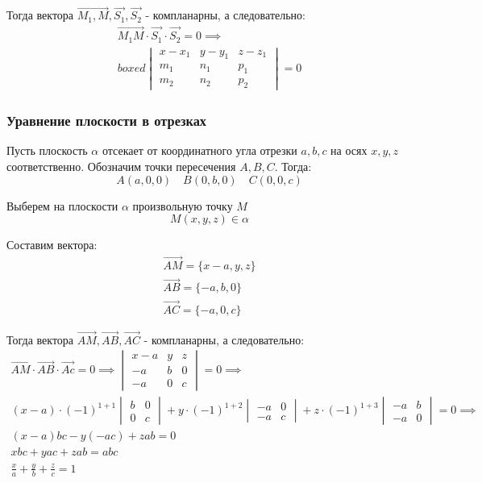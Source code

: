 Тогда вектора $\overrightarrow{M_1, M}, \vec{S_1}, \vec{S_2}$ - компланарны, а следовательно:
\begin{gather*}
  \overrightarrow{M_1 M} \cdot \vec{S_1} \cdot \vec{S_2} = 0
  \implies \\ boxed{
  \begin{vmatrix}
    x - x_1 & y - y_1 & z - z_1 \\
    m_1 & n_1 & p_1 \\
    m_2 & n_2 & p_2
  \end{vmatrix} = 0}
\end{gather*}

\subsubsection{Уравнение плоскости в отрезках}

Пусть плоскость $\alpha$ отсекает от координатного угла отрезки $a, b, c$ на осях  $x, y, z$ соответственно. Обозначим точки пересечения  $A, B, C$. Тогда: \[
  A(a, 0, 0) \quad B(0, b, 0) \quad C(0, 0, c)
\] 

Выберем на плоскости $\alpha$ произвольную точку $M$  \[
M(x, y, z) \in \alpha
\] 

Составим вектора:
\begin{gather*}
  \overrightarrow{AM} = \{x - a, y, z\} \\
  \overrightarrow{AB} = \{-a, b, 0\} \\
  \overrightarrow{AC} = \{-a , 0, c\} 
\end{gather*}

Тогда вектора $\overrightarrow{AM}, \overrightarrow{AB}, \overrightarrow{AC}$ - компланарны, а следовательно:
\begin{gather*}
  \overrightarrow{AM} \cdot \overrightarrow{AB} \cdot \overrightarrow{Ac} = 0
  \implies
  \begin{vmatrix}
    x - a & y & z \\
    -a & b & 0 \\
    -a & 0 & c
  \end{vmatrix} = 0 \implies \\
  (x - a) \cdot (-1)^{1+1} 
  \begin{vmatrix}
    b & 0 \\
    0 & c
  \end{vmatrix}
  + y \cdot (-1)^{1+2}
  \begin{vmatrix}
    -a & 0 \\
    -a & c
  \end{vmatrix}
  + z \cdot (-1)^{1+3}
  \begin{vmatrix}
    -a & b \\
    -a & 0
  \end{vmatrix} = 0 \implies \\
  (x - a) bc - y(-ac) + zab = 0 \\
  xbc + yac + zab = abc \\
  \boxed{\frac{x}{a} + \frac{y}{b} + \frac{z}{c} = 1}
\end{gather*}

